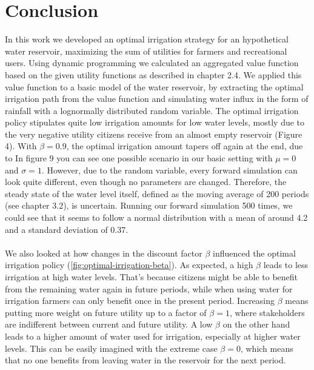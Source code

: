 \documentclass[12pt, a4paper, oneside]{article}
\begin{document}
\section{Conclusion}
In this work we developed an optimal irrigation strategy for an hypothetical water reservoir, maximizing the sum of utilities for farmers and recreational users.
Using dynamic programming we calculated an aggregated value function based on the given utility functions as described in chapter 2.4.
We applied this value function to a basic model of the water reservoir, by extracting the optimal irrigation path from the value function and simulating water influx in the form of rainfall with a lognormally distributed random variable.
The optimal irrigation policy stipulates quite low irrigation amounts for low water levels, mostly due to the very negative utility citizens receive from an almost empty reservoir (Figure 4).
With $\beta = 0.9$, the optimal irrigation amount tapers off again at the end, due to %
In figure 9 you can see one possible scenario in our basic setting with $\mu=0$ and $\sigma=1$.
However, due to the random variable, every forward simulation can look quite different, even though no parameters are changed.
Therefore, the steady state of the water level itself, defined as the moving average of 200 periods (see chapter 3.2), is uncertain.
Running our forward simulation 500 times, we could see that it seems to follow a normal distribution with a mean of around 4.2 and a standard deviation of 0.37. %
\\\\
We also looked at how changes in the discount factor $\beta$ influenced the optimal irrigation policy (\ref{fig:optimal-irrigation-beta}).
As expected, a high $\beta$ leads to less irrigation at high water levels.
That's because citizens might be able to benefit from the remaining water again in future periods, while when using water for irrigation farmers can only benefit once in the present period.
Increasing $\beta$ means putting more weight on future utility up to a factor of $\beta = 1$, where stakeholders are indifferent between current and future utility.
A low $\beta$ on the other hand leads to a higher amount of water used for irrigation, especially at higher water levels. 
This can be easily imagined with the extreme case $\beta = 0$, which means that no one benefits from leaving water in the reservoir for the next period.
\end{document}
